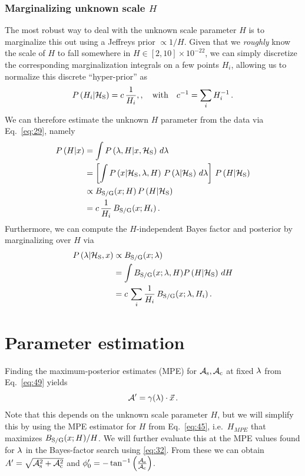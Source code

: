 \documentclass[aps,prd,onecolumn,notitlepage,nofootinbib,superscriptaddress,altaffilletter,floatfix]{revtex4-1}
\begin{document}
\subsubsection{Marginalizing unknown scale $H$}
\label{sec:marg-unkn-scale}

The most robust way to deal with the unknown scale parameter $H$ is to marginalize this out using a Jeffreys prior $\propto 1/H$. Given that we
\emph{roughly} know the scale of $H$ to fall somewhere in $H\in{[2,10]}\times10^{-22}$, we can simply discretize the corresponding marginalization
integrals on a few points ${H_i}$, allowing us to normalize this discrete ``hyper-prior'' as
\begin{equation}
  \label{eq:44}
  P\left(H_i\middle|\mathcal{H}_{\mathrm{S}}\right) = c\,\frac{1}{H_i},,\quad\text{with}\quad c^{-1} = \sum_i H_i^{-1}\,.
\end{equation}
We can therefore estimate the unknown $H$ parameter from the data via Eq.~\eqref{eq:29}, namely
\begin{align}
  \label{eq:45}
  P\left(H\middle|x\right) &= \int P\left(\lambda,H\middle|x,\mathcal{H}_{\mathrm{S}}\right)\,d\lambda\\
  &= \left[\int P\left(x\middle|\mathcal{H}_{\mathrm{S}},\lambda,H\right)\,P\left(\lambda\middle|\mathcal{H}_{\mathrm{S}}\right)\,d\lambda\right]\,P\left(H\middle|\mathcal{H}_{\mathrm{S}}\right)\\
  &\propto B_{\mathrm{S/G}}(x;H)\,P\left(H\middle|\mathcal{H}_{\mathrm{S}}\right) \\
  &= c\,\frac{1}{H_i}\,B_{\mathrm{S/G}}(x;H_i)\,.
\end{align}
Furthermore, we can compute the $H$-independent Bayes factor and posterior by marginalizing over $H$ via
\begin{align}
  \label{eq:46}
  P\left(\lambda\middle|\mathcal{H}_{\mathrm{S}},x\right) &\propto B_{\mathrm{S/G}}(x;\lambda)\\
  &=\int B_{\mathrm{S/G}}(x;\lambda,H)P\left(H\middle|\mathcal{H}_{\mathrm{S}}\right)\,dH\\
  &= c\,\sum_i \frac{1}{H_i} \, B_{\mathrm{S/G}}(x;\lambda,H_i)\,.
\end{align}

\section{Parameter estimation}
\label{sec:parameter-estimation}

Finding the maximum-posterior estimates (MPE) for ${\mathcal A}_{\mathrm{s}},{\mathcal A}_{\mathrm{c}}$ at fixed $\lambda$ from Eq.~\eqref{eq:49} yields
\begin{equation}
  \label{eq:31}
  {\mathcal A}' = \gamma(\lambda)\cdot\vec{x}\,.
\end{equation}
Note that this depends on the unknown scale parameter $H$, but we will simplify this by using the MPE estimator for $H$ from Eq.~\eqref{eq:45}, i.e.\
$H_{MPE}$ that maximizes  $B_{\mathrm{S/G}}(x;H) / H$.
We will further evaluate this at the MPE values found for $\lambda$ in the Bayes-factor search using \eqref{eq:32}.
From these we can obtain $A' = \sqrt{{\mathcal A}_{\mathrm{s}}^2+{\mathcal A}_{\mathrm{c}}^2}$ and $\phi_0' = - \tan^{-1}\left(\frac{{\mathcal A}_{\mathrm{s}}}{{\mathcal A}_{\mathrm{c}}}\right)$.
\end{document}
